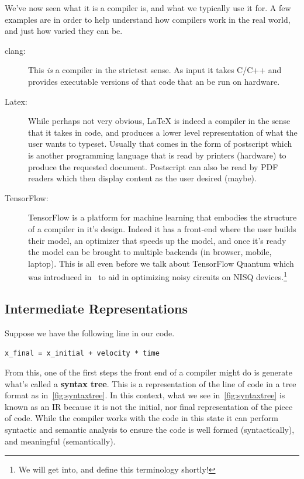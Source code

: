 We've now seen what it is a compiler is, and what we typically use it for.
A few examples are in order to help understand how compilers work in the real world, and just how varied they can be.

\begin{description}
    \item[clang:] This \emph{is} a compiler in the strictest sense. As input it takes C/C++ and provides executable versions of that code that an be run on hardware.
    \item[Latex:] While perhaps not very obvious, \LaTeX{} is indeed a compiler in the sense that it takes in code, and produces a lower level representation of what the user wants to typeset. Usually that comes in the form of postscript which is another programming language that is read by printers (hardware) to produce the requested document. Postscript can also be read by PDF readers which then display content as the user desired (maybe).
    \item[TensorFlow:] TensorFlow is a platform for machine learning that embodies the structure of a compiler in it's design. Indeed it has a front-end where the user builds their model, an optimizer that speeds up the model, and once it's ready the model can be brought to multiple backends (in browser, mobile, laptop). This is all even before we talk about TensorFlow Quantum which was introduced in~\cite{tensoflowquantum} to aid in optimizing noisy circuits on \acs{NISQ} devices.\footnote{We will get into, and define this terminology shortly!}
\end{description}

\subsection{Intermediate Representations}

Suppose we have the following line in our code.
\begin{center}
    \verb|x_final = x_initial + velocity * time|
\end{center}
From this, one of the first steps the front end of a compiler might do is generate what's called a \textbf{syntax tree}.
This is a representation of the line of code in a tree format as in~\cref{fig:syntaxtree}.
In this context, what we see in~\cref{fig:syntaxtree} is known as an \ac{IR} because it is not the initial, nor final representation of the piece of code.
While the compiler works with the code in this state it can perform syntactic and semantic analysis to ensure the code is well formed (syntactically), and meaningful (semantically).

